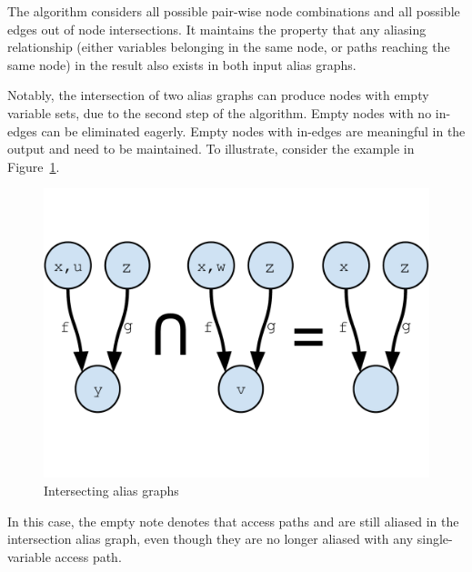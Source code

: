 The algorithm considers all possible pair-wise node combinations and
all possible edges out of node intersections. It maintains the
property that any aliasing relationship (either variables belonging in
the same node, or paths reaching the same node) in the result also
exists in both input alias graphs.

Notably, the intersection of two alias graphs can produce nodes with
empty variable sets, due to the second step of the algorithm. Empty
nodes with no in-edges can be eliminated eagerly. Empty nodes with
in-edges are meaningful in the output and need to be maintained. To
illustrate, consider the example in Figure~\ref{fig/intersection}.


\begin{figure}[h]
  \begin{minipage}[b]{\linewidth}
    \centering
    \includegraphics[trim={0mm 40mm 0mm 30mm},clip,width=0.9\linewidth]{assets/must-data/intersecting-alias-graphs.pdf}
  \end{minipage}
  \caption{Intersecting alias graphs}
    \label{fig/intersection}
\end{figure}

In this case, the empty note denotes that access paths  and
 are still aliased in the intersection alias graph, even
though they are no longer aliased with any single-variable access
path.



